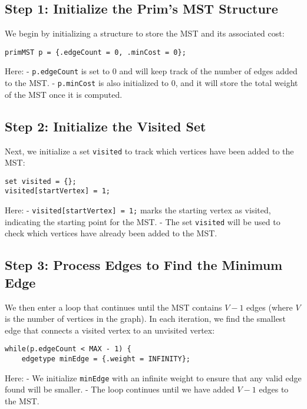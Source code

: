\documentclass{book}
\begin{document}
\onecolumn
\subsection{Step 1: Initialize the Prim's MST Structure}

We begin by initializing a structure to store the MST and its associated cost:

\begin{verbatim}
primMST p = {.edgeCount = 0, .minCost = 0};
\end{verbatim}

Here:
- \texttt{p.edgeCount} is set to 0 and will keep track of the number of edges added to the MST.
- \texttt{p.minCost} is also initialized to 0, and it will store the total weight of the MST once it is computed.

\subsection{Step 2: Initialize the Visited Set}

Next, we initialize a set \texttt{visited} to track which vertices have been added to the MST:

\begin{verbatim}
set visited = {};
visited[startVertex] = 1;
\end{verbatim}

Here:
- \texttt{visited[startVertex] = 1;} marks the starting vertex as visited, indicating the starting point for the MST.
- The set \texttt{visited} will be used to check which vertices have already been added to the MST.

\subsection{Step 3: Process Edges to Find the Minimum Edge}

We then enter a loop that continues until the MST contains \(V - 1\) edges (where \(V\) is the number of vertices in the graph). In each iteration, we find the smallest edge that connects a visited vertex to an unvisited vertex:

\begin{verbatim}
while(p.edgeCount < MAX - 1) {
    edgetype minEdge = {.weight = INFINITY};
\end{verbatim}

Here:
- We initialize \texttt{minEdge} with an infinite weight to ensure that any valid edge found will be smaller.
- The loop continues until we have added \(V - 1\) edges to the MST.
\end{document}
